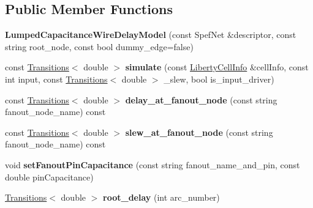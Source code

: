 \subsection*{Public Member Functions}
\begin{DoxyCompactItemize}
\item 
\hypertarget{classLumpedCapacitanceWireDelayModel_ae147cdba517e3f6152ed8234473e5443}{{\bfseries Lumped\-Capacitance\-Wire\-Delay\-Model} (const Spef\-Net \&descriptor, const string root\-\_\-node, const bool dummy\-\_\-edge=false)}\label{classLumpedCapacitanceWireDelayModel_ae147cdba517e3f6152ed8234473e5443}

\item 
\hypertarget{classLumpedCapacitanceWireDelayModel_a1bba0aef3bebe8df97a63e05b307b19a}{const \hyperlink{classTransitions}{Transitions}$<$ double $>$ {\bfseries simulate} (const \hyperlink{structLibertyCellInfo}{Liberty\-Cell\-Info} \&cell\-Info, const int input, const \hyperlink{classTransitions}{Transitions}$<$ double $>$ \-\_\-slew, bool is\-\_\-input\-\_\-driver)}\label{classLumpedCapacitanceWireDelayModel_a1bba0aef3bebe8df97a63e05b307b19a}

\item 
\hypertarget{classLumpedCapacitanceWireDelayModel_a0266cb676908d95bdfcb64d1137898b0}{const \hyperlink{classTransitions}{Transitions}$<$ double $>$ {\bfseries delay\-\_\-at\-\_\-fanout\-\_\-node} (const string fanout\-\_\-node\-\_\-name) const }\label{classLumpedCapacitanceWireDelayModel_a0266cb676908d95bdfcb64d1137898b0}

\item 
\hypertarget{classLumpedCapacitanceWireDelayModel_aaedd69e811e7220e48493c51fb0443ed}{const \hyperlink{classTransitions}{Transitions}$<$ double $>$ {\bfseries slew\-\_\-at\-\_\-fanout\-\_\-node} (const string fanout\-\_\-node\-\_\-name) const }\label{classLumpedCapacitanceWireDelayModel_aaedd69e811e7220e48493c51fb0443ed}

\item 
\hypertarget{classLumpedCapacitanceWireDelayModel_a888f7e6a4951837072b937ae30e93073}{void {\bfseries set\-Fanout\-Pin\-Capacitance} (const string fanout\-\_\-name\-\_\-and\-\_\-pin, const double pin\-Capacitance)}\label{classLumpedCapacitanceWireDelayModel_a888f7e6a4951837072b937ae30e93073}

\item 
\hypertarget{classLumpedCapacitanceWireDelayModel_ab090355a74a21b5d6008352ff2a7d137}{\hyperlink{classTransitions}{Transitions}$<$ double $>$ {\bfseries root\-\_\-delay} (int arc\-\_\-number)}\label{classLumpedCapacitanceWireDelayModel_ab090355a74a21b5d6008352ff2a7d137}


\end{DoxyCompactItemize}
